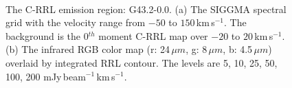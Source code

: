 \documentclass[manuscript]{aastex61}
\newcommand{\kms}{\,km\,s$^{-1}$}
\newcommand{\um}{\mu m}
\begin{document}
\begin{figure}[H]
\centering
{}
\\ 
\caption{The C-RRL emission region: G43.2-0.0.
          (a) The SIGGMA spectral grid with the velocity range from $-50$ to $150$\kms.
	  The background is the 0$^{th}$ moment C-RRL map over $-20$ to $20$\kms.
	  (b) The infrared RGB color map (r: 24\,$\um$, g: 8\,$\um$, b: 4.5\,$\um$) overlaid by integrated RRL contour.
	  The levels are 5, 10, 25, 50, 100, 200 mJy\,beam$^{-1}$\kms.}
\label{fig_crrl-g432}
\end{figure}
\end{document}
